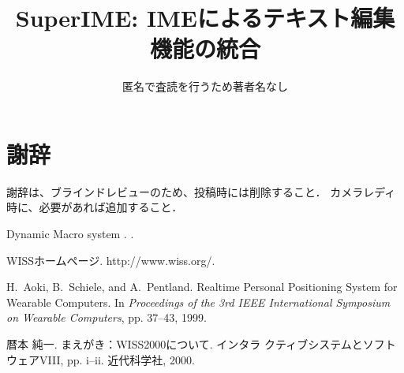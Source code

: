 \documentclass[twoside]{wiss}
\def\system{SuperIME}
\def\papertitle{\system: IMEによるテキスト編集機能の統合}
\begin{document}
\title{\papertitle}
\etitle{}%
%
%
%
\author{匿名で査読を行うため著者名なし
	}



\maketitle









\section*{謝辞}

謝辞は、ブラインドレビューのため、投稿時には削除すること．
カメラレディ時に、必要があれば追加すること．

Dynamic Macro system\cite{DynamicMacro}
\cite{texteditors.org}
\cite{Kawada:WP}
\cite{Mori:WordProcessor}
\cite{Doi:STARS}
\cite{Doi:COLING98}
\cite{texteditors.org}
\cite{Li:1lineKB}\cite{MacKenzie:H4Writer}\cite{Rick:VirtualKB}
\cite{Dietz:PressureKB}\cite{Harrison:Skinput}\cite{Murase:CameraKB}\cite{Wigdor:TiltKB}
\cite{Tesler:CopyPaste}.
\cite{Masui:Goldfish}\cite{PickAndDrop}.


{\scriptsize


}

%
%
\begin{thebibliography}{1}

 WISSホームページ.  http://www.wiss.org/.

 H.~Aoki, B.~Schiele, and A.~Pentland.  Realtime
Personal Positioning System for Wearable Computers.  In
\emph{Proceedings of the 3rd IEEE International Symposium on Wearable
Computers}, pp. 37--43, 1999.

 暦本 純一.  まえがき：WISS2000について.  インタラ
クティブシステムとソフトウェアVIII, pp. i--ii. 近代科学社, 2000.

\end{thebibliography}
\end{document}
